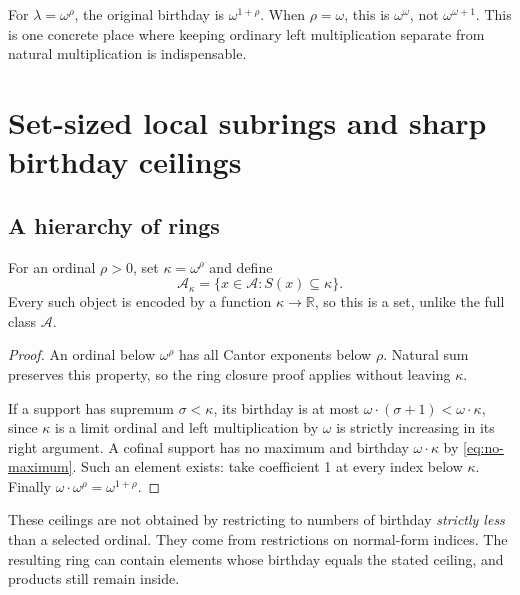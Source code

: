 \documentclass[11pt,letterpaper]{article}
\newtheorem{proposition}[theorem]{Proposition}
\theoremstyle{definition}
\theoremstyle{remark}
\newcommand{\R}{\mathbb{R}}
\newcommand{\A}{\mathscr{A}}
\newcommand{\bd}{\ell}
\begin{document}
For \(\lambda=\omega^\rho\), the original birthday is
\(\omega^{1+\rho}\). When \(\rho=\omega\), this is
\(\omega^\omega\), not \(\omega^{\omega+1}\). This is one concrete
place where keeping ordinary left multiplication separate from natural
multiplication is indispensable.

\section{Set-sized local subrings and sharp birthday ceilings}

\subsection{A hierarchy of rings}
For an ordinal \(\rho>0\), set \(\kappa=\omega^\rho\) and define
\begin{equation}\label{eq:bounded-ring}
 \A_\kappa=\{x\in\A:S(x)\subseteq\kappa\}.
\end{equation}
Every such object is encoded by a function \(\kappa\to\R\), so this
is a set, unlike the full class \(\A\).

\begin{proof}
An ordinal below \(\omega^\rho\) has all Cantor exponents below
\(\rho\). Natural sum preserves this property, so the ring closure
proof applies without leaving \(\kappa\).

If a support has supremum \(\sigma<\kappa\), its birthday is at most
\(\omega\cdot(\sigma+1)<\omega\cdot\kappa\), since \(\kappa\)
is a limit ordinal and left multiplication by \(\omega\) is strictly
increasing in its right argument. A cofinal support has no maximum and
birthday \(\omega\cdot\kappa\) by \eqref{eq:no-maximum}. Such an
element exists: take coefficient 1 at every index below \(\kappa\).
Finally \(\omega\cdot\omega^\rho=\omega^{1+\rho}\).
\end{proof}

These ceilings are not obtained by restricting to numbers of birthday
\emph{strictly less} than a selected ordinal. They come from restrictions
on normal-form indices. The resulting ring can contain elements whose
birthday equals the stated ceiling, and products still remain inside.
\end{document}
